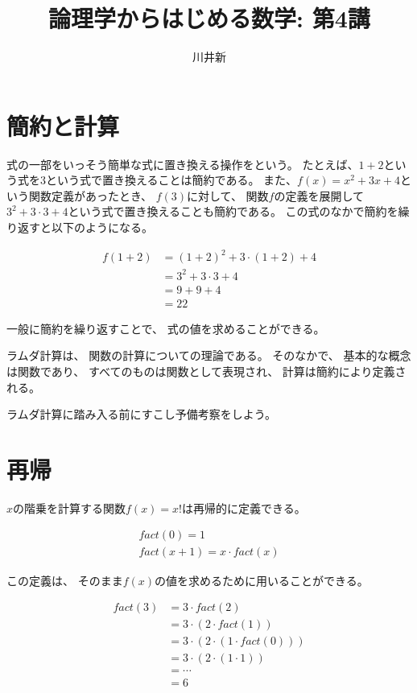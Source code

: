 \documentclass[fleqn]{jsarticle}
\title{論理学からはじめる数学: 第4講}
\author{川井新}
\begin{document}
\maketitle

\section{簡約と計算}

式の一部をいっそう簡単な式に置き換える操作をという。
たとえば、$1+2$という式を$3$という式で置き換えることは簡約である。
また、$f(x)=x^2+3x+4$という関数定義があったとき、
$f(3)$に対して、
関数$f$の定義を展開して$3^2+3 \cdot 3 +4$という式で置き換えることも簡約である。
この式のなかで簡約を繰り返すと以下のようになる。

\begin{align*}
  f(1+2) &= (1+2)^2 + 3 \cdot (1+2) + 4\\
         &= 3^2 + 3 \cdot 3 + 4\\
         &= 9 + 9 + 4\\
         &= 22
\end{align*}

一般に簡約を繰り返すことで、
式の値を求めることができる。

ラムダ計算は、
関数の計算についての理論である。
そのなかで、
基本的な概念は関数であり、
すべてのものは関数として表現され、
計算は簡約により定義される。

ラムダ計算に踏み入る前にすこし予備考察をしよう。

\section{再帰}

$x$の階乗を計算する関数$f(x) = x!$は再帰的に定義できる。

\begin{gather*}
  fact(0) = 1\\
  fact(x+1) = x \cdot fact(x)
\end{gather*}

この定義は、
そのまま$f(x)$の値を求めるために用いることができる。

\begin{align*}
  fact(3) &= 3 \cdot fact(2)\\
          &= 3 \cdot (2 \cdot fact(1))\\
          &= 3 \cdot (2 \cdot (1 \cdot fact(0)))\\
          &= 3 \cdot (2 \cdot (1 \cdot 1))\\
          &= \cdots\\
          &= 6
\end{align*}
\end{document}
